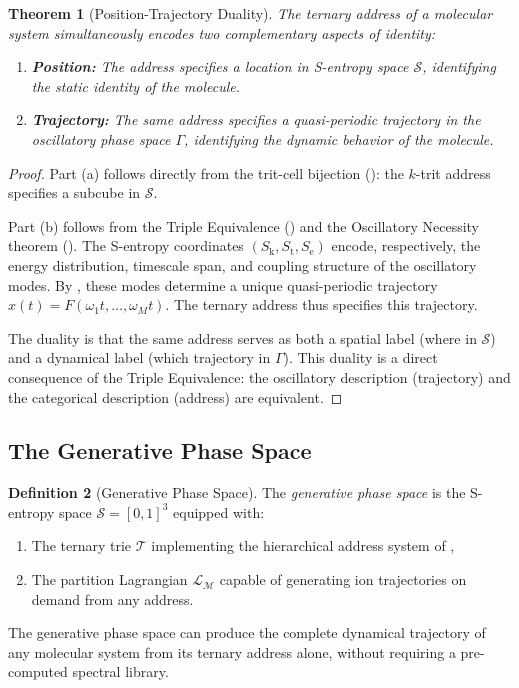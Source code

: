 \documentclass[11pt,twocolumn,a4paper]{article}
\newtheorem{theorem}{Theorem}[section]
\theoremstyle{definition}
\newtheorem{definition}[theorem]{Definition}
\theoremstyle{remark}
\newcommand{\Sk}{S_{\mathrm{k}}}
\newcommand{\St}{S_{\mathrm{t}}}
\newcommand{\Se}{S_{\mathrm{e}}}
\newcommand{\Sspace}{\mathcal{S}}
\newcommand{\Depth}{\mathcal{M}}
\newcommand{\Trie}{\mathcal{T}}
\newcommand{\Lagr}{\mathcal{L}}
\begin{document}
\begin{theorem}[Position-Trajectory Duality]\label{thm:position-trajectory}
The ternary address of a molecular system simultaneously encodes two complementary aspects of identity:
\begin{enumerate}[label=(\alph*)]
  \item \textbf{Position:} The address specifies a location in S-entropy space $\Sspace$, identifying the static identity of the molecule.
  \item \textbf{Trajectory:} The same address specifies a quasi-periodic trajectory in the oscillatory phase space $\Gamma$, identifying the dynamic behavior of the molecule.
\end{enumerate}
\end{theorem}

\begin{proof}
Part (a) follows directly from the trit-cell bijection (): the $k$-trit address specifies a subcube in $\Sspace$.

Part (b) follows from the Triple Equivalence () and the Oscillatory Necessity theorem (). The S-entropy coordinates $(\Sk, \St, \Se)$ encode, respectively, the energy distribution, timescale span, and coupling structure of the oscillatory modes. By , these modes determine a unique quasi-periodic trajectory $x(t) = F(\omega_1 t, \ldots, \omega_M t)$. The ternary address thus specifies this trajectory.

The duality is that the same address serves as both a spatial label (where in $\Sspace$) and a dynamical label (which trajectory in $\Gamma$). This duality is a direct consequence of the Triple Equivalence: the oscillatory description (trajectory) and the categorical description (address) are equivalent.
\end{proof}

\subsection{The Generative Phase Space}\label{sec:generative}

\begin{definition}[Generative Phase Space]\label{def:gen-phase}
The \emph{generative phase space} is the S-entropy space $\Sspace = [0,1]^3$ equipped with:
\begin{enumerate}[label=(\roman*)]
  \item The ternary trie $\Trie$ implementing the hierarchical address system of ,
  \item The partition Lagrangian $\Lagr_{\Depth}$ capable of generating ion trajectories on demand from any address.
\end{enumerate}
The generative phase space can produce the complete dynamical trajectory of any molecular system from its ternary address alone, without requiring a pre-computed spectral library.
\end{definition}
\end{document}
